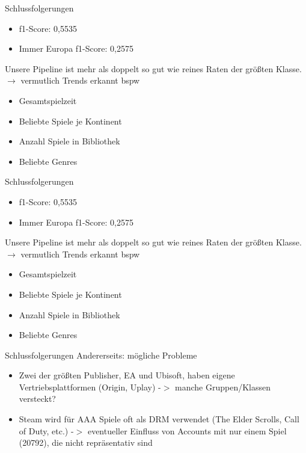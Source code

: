 \documentclass[12pt]{beamer}
\begin{document}
\begin{frame}[fragile]{Schlussfolgerungen}
	\begin{itemize}
		\item f1-Score: 0,5535
		\item Immer Europa f1-Score: 0,2575
	\end{itemize}
	Unsere Pipeline ist mehr als doppelt so gut wie reines Raten der größten Klasse. \\
	$ \rightarrow $ vermutlich Trends erkannt bspw
	\begin{itemize}
		\item Gesamtspielzeit
		\item Beliebte Spiele je Kontinent
		\item Anzahl Spiele in Bibliothek
		\item Beliebte Genres
	\end{itemize}  
\end{frame}

\begin{frame}[fragile]{Schlussfolgerungen}
	\begin{itemize}
		\item f1-Score: 0,5535
		\item Immer Europa f1-Score: 0,2575
	\end{itemize}
	Unsere Pipeline ist mehr als doppelt so gut wie reines Raten der größten Klasse. \\
	$ \rightarrow $ vermutlich Trends erkannt bspw
	\begin{itemize}
		\item Gesamtspielzeit
		\item Beliebte Spiele je Kontinent
		\item Anzahl Spiele in Bibliothek
		\item Beliebte Genres
	\end{itemize}  
\end{frame}

\begin{frame}[fragile]{Schlussfolgerungen}
Andererseits: mögliche Probleme
	\begin{itemize}
		\item Zwei der größten Publisher, EA und Ubisoft, haben eigene Vertriebsplattformen (Origin, Uplay) -$>$ manche Gruppen/Klassen versteckt?
		\item Steam wird für AAA Spiele oft als DRM verwendet (The Elder Scrolls, Call of Duty, etc.) -$>$ eventueller Einfluss von Accounts mit nur einem Spiel (20792), die nicht repräsentativ sind
	\end{itemize}  
\end{frame}
\end{document}
